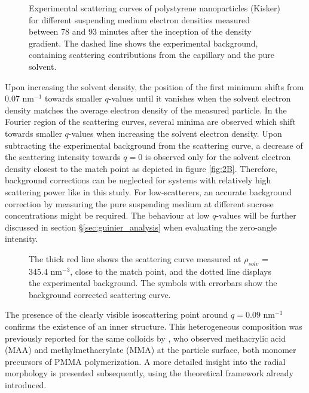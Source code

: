 \begin{figure}%
	\centering
		
		\caption{Experimental scattering curves of polystyrene nanoparticles (Kisker) for different suspending medium electron densities measured between 78 and 93 minutes after the inception of the density gradient. The dashed line shows the experimental background, containing scattering contributions from the capillary and the pure solvent.}
		\label{fig:KiskerContinuousSAXS}
\end{figure}

Upon increasing the solvent density, the position of the first minimum shifts from 0.07 nm\(^{-1}\) towards smaller \(q\)-values until it vanishes when the solvent electron density matches the average electron density of the measured particle. In the Fourier region of the scattering curves, several minima are observed which shift towards smaller \(q\)-values when increasing the solvent electron density. Upon subtracting the experimental background from the scattering curve, a decrease of the scattering intensity towards $q=0$ is observed only for the solvent electron density closest to the match point as depicted in figure \ref{fig:2B}. Therefore, background corrections can be neglected for systems with relatively high scattering power like in this study. For low-scatterers, an accurate background correction by measuring the pure suspending medium at different sucrose concentrations might be required. The behaviour at low $q$-values will be further discussed in section \S\ref{sec:guinier_analysis} when evaluating the zero-angle intensity.

\begin{figure}%
	\centering
		
		\caption{The thick red line shows the scattering curve measured at $\rho_{solv}$ = 345.4 nm$^{-3}$, close to the match point, and the dotted line displays the experimental background. The symbols with errorbars show the background corrected scattering curve.}
		\label{fig:KiskerBackgroundSubtraction}
\end{figure}

The presence of the clearly visible isoscattering point around \(q=0.09\) nm\(^{-1}\) confirms the existence of an inner structure. This heterogeneous composition was previously reported for the same colloids by \citet{minelli_characterization_2014-1}, who observed methacrylic acid (MAA) and methylmethacrylate (MMA) at the particle surface, both monomer precursors of PMMA polymerization. A more detailed insight into the radial morphology is presented subsequently, using the theoretical framework already introduced.

